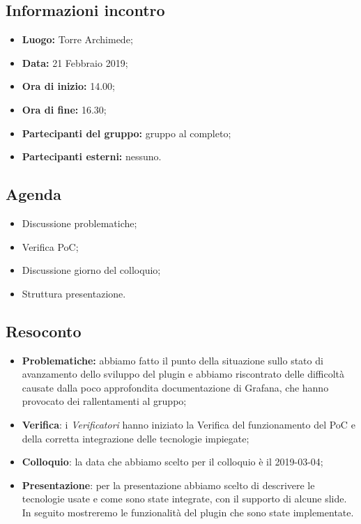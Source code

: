 \subsection{Informazioni incontro}
\begin{itemize}
	\item { \textbf{Luogo:} Torre Archimede};
	\item { \textbf{Data:} 21 Febbraio 2019};
	\item { \textbf{Ora di inizio:} 14.00};
	\item { \textbf{Ora di fine:} 16.30};
	\item { \textbf{Partecipanti del gruppo:} gruppo al completo};
	\item { \textbf{Partecipanti esterni:} nessuno}.
\end{itemize}


\subsection{Agenda}
\begin{itemize}
	\item {Discussione problematiche;}
	\item {Verifica PoC;}
	\item {Discussione giorno del colloquio;}
	\item {Struttura presentazione.}
\end{itemize}

\subsection{Resoconto}
\begin{itemize}
	\item {\textbf{Problematiche:} abbiamo fatto il punto della situazione sullo stato di avanzamento dello sviluppo del plugin e abbiamo riscontrato delle difficoltà causate dalla poco approfondita documentazione di Grafana, che hanno provocato dei rallentamenti al gruppo;}
	\item { \textbf{Verifica}: i \emph{Verificatori} hanno iniziato la Verifica del funzionamento del PoC e della corretta integrazione delle tecnologie impiegate;}
	\item { \textbf{Colloquio}: la data che abbiamo scelto per il colloquio è il 2019-03-04;}
	\item { \textbf{Presentazione}: per la presentazione abbiamo scelto di descrivere le tecnologie usate e come sono state integrate, con il supporto di alcune slide. In seguito mostreremo le funzionalità del plugin che sono state implementate.}
\end{itemize}

